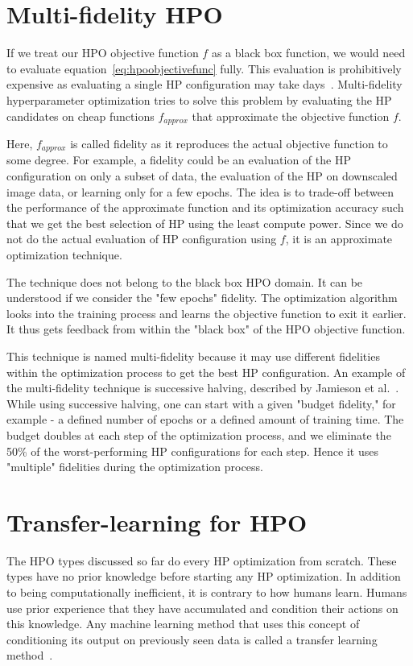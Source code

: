 \documentclass[12pt, twoside, ngerman]{report}
\begin{document}
\section{Multi-fidelity HPO}
If we treat our HPO objective function $f$ as a black box function, we would need to evaluate equation~\ref{eq:hpoobjectivefunc} fully.
This evaluation is prohibitively expensive as evaluating a single HP configuration may take days~\cite{hutter2019automated}.
Multi-fidelity hyperparameter optimization tries to solve this problem by evaluating the HP candidates on cheap functions $f_{approx}$ that approximate the objective function $f$.

Here, $f_{approx}$  is called fidelity as it reproduces the actual objective function to some degree.
For example, a fidelity could be an evaluation of the HP configuration on only a subset of data, the evaluation of the HP on downscaled image data, or learning only for a few epochs.
The idea is to trade-off between the performance of the approximate function and its optimization accuracy such that we get the best selection of HP using the least compute power.
Since we do not do the actual evaluation of HP configuration using $f$, it is an approximate optimization technique.

The technique does not belong to the black box HPO domain.
It can be understood if we consider the "few epochs" fidelity.
The optimization algorithm looks into the training process and learns the objective function to exit it earlier.
It thus gets feedback from within the "black box" of the HPO objective function.

This technique is named multi-fidelity because it may use different fidelities within the optimization process to get the best HP configuration.
An example of the multi-fidelity technique is successive halving, described by Jamieson et al.~\cite{successivehalving}. While using successive halving, one can start with a given "budget fidelity," for example - a defined number of epochs or a defined amount of training time.
The budget doubles at each step of the optimization process, and we eliminate the 50\% of the worst-performing HP configurations for each step.
Hence it uses "multiple" fidelities during the optimization process.


\section{Transfer-learning for HPO}

The HPO types discussed so far do every HP optimization from scratch. These types have no prior knowledge before starting any HP optimization.
In addition to being computationally inefficient,  it is contrary to how humans learn.
Humans use prior experience that they have accumulated and condition their actions on this knowledge.
Any machine learning method that uses this concept of conditioning its output on previously seen data is called a transfer learning method~\cite{Weiss2016}.
\end{document}

